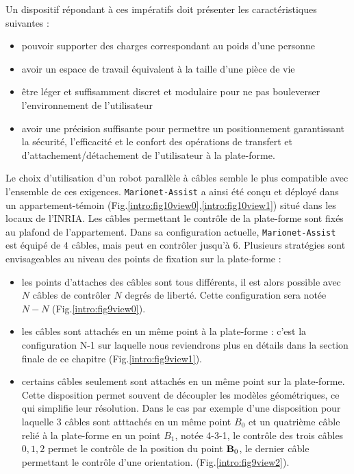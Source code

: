Un dispositif répondant à ces impératifs doit présenter les caractéristiques 
suivantes :
\begin{itemize}
 \item pouvoir supporter des charges correspondant au poids d'une personne
 \item avoir un espace de travail équivalent à la taille d'une pièce de vie
 \item être léger et suffisamment discret et modulaire pour ne pas bouleverser 
l'environnement de l'utilisateur
 \item avoir une précision suffisante pour permettre un positionnement 
garantissant la sécurité, l'efficacité et le confort des opérations de 
transfert et d'attachement/détachement de l'utilisateur à la plate-forme.
\end{itemize}

Le choix d'utilisation d'un robot parallèle à câbles semble le plus
compatible avec l'ensemble de ces exigences. {\tt Marionet-Assist} a ainsi été 
conçu et déployé dans un appartement-témoin 
(Fig.\ref{intro:fig10view0},\ref{intro:fig10view1}) situé dans les locaux 
de l'INRIA. Les câbles permettant le contrôle de la plate-forme sont fixés au 
plafond de l'appartement. Dans sa configuration actuelle, {\tt Marionet-Assist} 
est équipé de $4$ câbles, mais peut en contrôler jusqu'à $6$. Plusieurs 
stratégies sont envisageables au niveau des points de fixation sur la 
plate-forme :
\begin{itemize}
 \item les points d'attaches des câbles sont tous différents, il est alors 
possible avec $N$ câbles de contrôler $N$ degrés de liberté. Cette 
configuration sera notée $N-N$ (Fig.\ref{intro:fig9view0}).
 \item les câbles sont attachés en un même point à la plate-forme : c'est la 
configuration N-1 sur laquelle nous reviendrons plus en d\'etails dans la 
section finale de ce chapitre (Fig.\ref{intro:fig9view1}).
 \item certains câbles seulement sont attachés en un même point sur la 
plate-forme. Cette disposition permet souvent de découpler les modèles 
géomé\-triques, ce qui simplifie leur résolution. Dans le cas par exemple d'une 
disposition pour laquelle $3$ câbles sont atttachés en un même point $B_0$ et un 
quatrième câble relié à la plate-forme en un point $B_1$, notée 4-3-1, le 
contrôle des trois câbles $0, 1, 2$ permet le contrôle de la position du point 
${\bf B}_0$, le dernier câble permettant le contrôle d'une orientation. 
(Fig.\ref{intro:fig9view2}).
\end{itemize}


